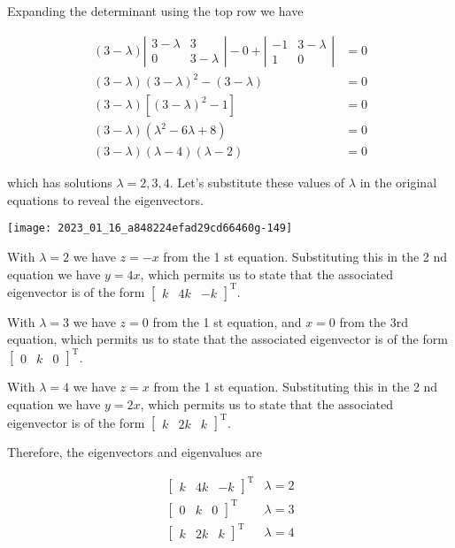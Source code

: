 Expanding the determinant using the top row we have

$$
\begin{aligned}
(3-\lambda)\left|\begin{array}{cc}
3-\lambda & 3 \\
0 & 3-\lambda
\end{array}\right|-0+\left|\begin{array}{cc}
-1 & 3-\lambda \\
1 & 0
\end{array}\right| & =0 \\
(3-\lambda)(3-\lambda)^{2}-(3-\lambda) & =0 \\
(3-\lambda)\left[(3-\lambda)^{2}-1\right] & =0 \\
(3-\lambda)\left(\lambda^{2}-6 \lambda+8\right) & =0 \\
(3-\lambda)(\lambda-4)(\lambda-2) & =0
\end{aligned}
$$

which has solutions $\lambda=2,3,4$. Let's substitute these values of $\lambda$ in the original equations to reveal the eigenvectors.

\begin{center}
\texttt{[image: 2023\_01\_16\_a848224efad29cd66460g-149]}
\end{center}

With $\lambda=2$ we have $z=-x$ from the 1 st equation. Substituting this in the 2 nd equation we have $y=4 x$, which permits us to state that the associated eigenvector is of the form $\left[\begin{array}{lll}k & 4 k & -k\end{array}\right]^{\mathrm{T}}$.

With $\lambda=3$ we have $z=0$ from the 1 st equation, and $x=0$ from the 3rd equation, which permits us to state that the associated eigenvector is of the form $\left[\begin{array}{lll}0 & k & 0\end{array}\right]^{\mathrm{T}}$.

With $\lambda=4$ we have $z=x$ from the 1 st equation. Substituting this in the 2 nd equation we have $y=2 x$, which permits us to state that the associated eigenvector is of the form $\left[\begin{array}{lll}k & 2 k & k\end{array}\right]^{\mathrm{T}}$.

Therefore, the eigenvectors and eigenvalues are

$$
\begin{array}{rrr}
{\left[\begin{array}{rrr}
k & 4 k & -k
\end{array}\right]^{\mathrm{T}}} & \lambda=2 \\
{\left[\begin{array}{lll}
0 & k & 0
\end{array}\right]^{\mathrm{T}}} & \lambda=3 \\
{\left[\begin{array}{lll}
k & 2 k & k
\end{array}\right]^{\mathrm{T}}} & \lambda=4
\end{array}
$$

